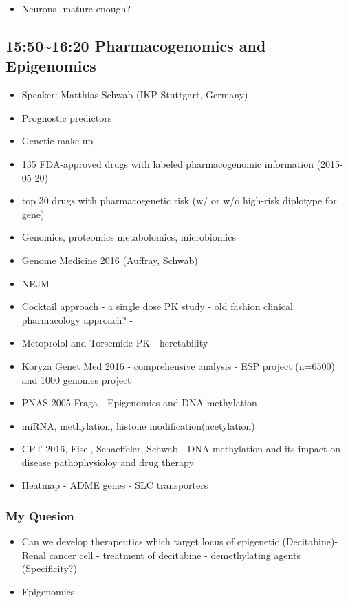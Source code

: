 \documentclass[]{book}
\providecommand{\tightlist}{%
  \setlength{\itemsep}{0pt}\setlength{\parskip}{0pt}}
\begin{document}
\begin{itemize}
\tightlist
\item
  Neurons- mature enough?
\end{itemize}

\subsection{15:50\textasciitilde{}16:20 Pharmacogenomics and
Epigenomics}\label{pharmacogenomics-and-epigenomics}

\begin{itemize}
\tightlist
\item
  Speaker: Matthias Schwab (IKP Stuttgart, Germany)
\item
  Prognostic predictors
\item
  Genetic make-up
\item
  135 FDA-approved drugs with labeled pharmacogenomic information
  (2015-05-20)
\item
  top 30 drugs with pharmacogenetic risk (w/ or w/o high-risk diplotype
  for gene)
\item
  Genomics, proteomics metabolomics, microbiomics
\item
  Genome Medicine 2016 (Auffray, Schwab)
\item
  NEJM
\item
  Cocktail approach - a single dose PK study - old fashion clinical
  pharmacology approach? -
\item
  Metoprolol and Torsemide PK - heretability
\item
  Koryza Genet Med 2016 - comprehensive analysis - ESP project (n=6500)
  and 1000 genomes project
\item
  PNAS 2005 Fraga - Epigenomics and DNA methylation
\item
  miRNA, methylation, histone modification(acetylation)
\item
  CPT 2016, Fisel, Schaeffeler, Schwab - DNA methylation and its impact
  on disease pathophysioloy and drug therapy
\item
  Heatmap - ADME genes - SLC transporters
\end{itemize}

\subsubsection{My Quesion}\label{my-quesion}

\begin{itemize}
\tightlist
\item
  Can we develop therapeutics which target locus of epigenetic
  (Decitabine)- Renal cancer cell - treatment of decitabine -
  demethylating agents (Specificity?)
\item
  Epigenomics
\end{itemize}
\end{document}
